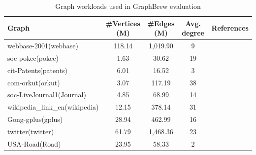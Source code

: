\documentclass[sigconf, nonacm]{acmart}
\begin{document}
\begin{scriptsize}
	\begin{table}[t]
		\centering
		\caption{Graph workloads used in GraphBrew evaluation}
			\begin{tabular}{@{}lcccc@{}}
				\toprule \toprule
				\textbf{Graph}      & \textbf{\#Vertices (M)} & \textbf{\#Edges (M)} & \textbf{Avg. degree} & \textbf{References}                                                                  \\
				\midrule
				webbase-2001(webbase)        & 118.14                 & 1,019.90             & 9                    & \cite{boldi_webgraph_2003,beamer_gap_2017}                        \\
				soc-pokec(pokec)             & 1.63                   & 30.62                & 19                   & \cite{takac_data_2012}                                                               \\
				cit-Patents(patents)         & 6.01                   & 16.52                & 3                    & \cite{leskovec_graphs_2005}                                                          \\
				com-orkut(orkut)             & 3.07                   & 117.19               & 38                   & \cite{yang_defining_2015}                                                            \\
				soc-LiveJournal1(Journal)    & 4.85                   & 68.99                & 14                   & \cite{backstrom_group_2006,leskovec_community_2009}                                  \\
				wikipedia\_link\_en(wikipedia) & 12.15                & 378.14               & 31                   & \cite{noauthor_wikipedia_2013,kunegis_konect_2013}                                 \\
				Gong-gplus(gplus)           & 28.94                   & 462.99               & 16                   & \cite{gong_joint_2014,gong_reciprocal_2014,gong_evolution_2012,lakhotia_recall_2017} \\
                    twitter(twitter)            & 61.79                   & 1,468.36             & 23                   & \cite{noauthor_9th_nodate,beamer_gap_2017}                                           \\
				USA-Road(Road)              & 23.95                   & 58.33                & 2                    & \cite{noauthor_9th_nodate,beamer_gap_2017}                                           \\
				\bottomrule  \bottomrule
			\end{tabular}
		\label{table:graph}
	\end{table}
\end{scriptsize}
\end{document}
